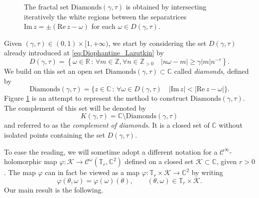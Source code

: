 \documentclass[10pt]{article}
\newcommand{\Z}{\mathbb{Z}}
\newcommand{\R}{\mathbb{R}}
\newcommand{\C}{\mathbb{C}}
\newcommand{\T}{\mathbb{T}}
\newcommand{\re}{\text{Re}\,}
\newcommand{\im}{\text{Im}\,}
\begin{document}
\begin{figure}
    \centering
\usetikzlibrary{arrows}
    \caption{The fractal set $\text{Diamonds}(\gamma,\tau)$ is obtained by intersecting iteratively the white regions between the separatrices $\im z = \pm(\re z - \omega)$ for each $\omega\in D(\gamma,\tau)$.}
    \label{fig:diamonds_precise}
\end{figure}

Given $(\gamma,\tau)\in (0,1)\times[1,+\infty)$, we start by considering the set $D(\gamma, \tau)$ already introduced at \eqref{eq:Diophantine_Lazutkin} by
\[
D(\gamma, \tau) = \left\{\omega\in\R\,:\, \forall m \in \Z, \forall n\in \Z_{> 0}\quad 
| n\omega-m|\geq \gamma|m|n^{-\tau}\right\}.
\]
We build on this set an open set $\text{Diamonds}(\gamma,\tau)\subset \C$ called \emph{diamonds}, defined by 
\[
\text{Diamonds}(\gamma,\tau) = 
\{ z\in\C
\,:\,
\forall\omega\in D(\gamma,\tau)\quad |\im z|<|\re z-\omega|
\}.
\]
Figure \ref{fig:diamonds_precise} is an attempt to represent the method to construct $\text{Diamonds}(\gamma,\tau)$. The complement of this set will be denoted by
\begin{equation}
\label{eq:complement_diamonds}
K(\gamma,\tau) = \C\setminus \text{Diamonds}(\gamma,\tau)
\end{equation}
and referred to as the \textit{complement of diamonds}. It is a closed set of $\C$ without isolated points containing the set $D(\gamma,\tau)$.

\vspace{0.2cm}
To ease the reading, we will sometime adopt a different notation for a $\mathscr C^{\infty}$-holomorphic map $\varphi:\mathcal K\to \mathscr C^{\omega}(\T_r,\C^2)$ defined on a closed set $\mathcal K\subset \C$, given $r>0$. The map $\varphi$ can in fact be viewed as a map $\varphi: \T_r\times \mathcal K\to\C^2$ by writing
\[
\varphi(\theta,\omega) = \varphi(\omega)(\theta),
\qquad (\theta,\omega)\in \T_r\times \mathcal K.
\]
Our main result is the following.
\end{document}
